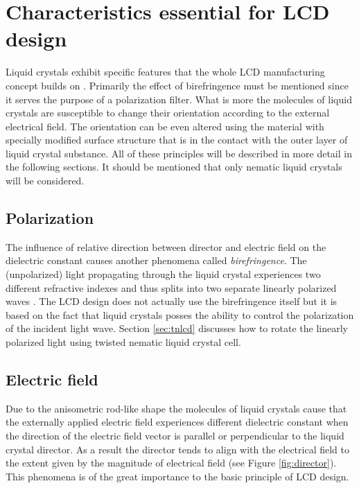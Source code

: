 \section{Characteristics essential for LCD design} \label{txt:charsForLCD}
Liquid crystals exhibit specific features that the whole LCD manufacturing concept builds on \cite{CWRU2011PolymersAndLC}. Primarily the effect of birefringence must be mentioned since it serves the purpose of a polarization filter. What is more the molecules of liquid crystals are susceptible to change their orientation according to the external electrical field. The orientation can be even altered using the material with specially modified surface structure that is in the contact with the outer layer of liquid crystal substance. All of these principles will be described in more detail in the following sections. It should be mentioned that only nematic liquid crystals will be considered.

\subsection{Polarization}
The influence of relative direction between director and electric field on the dielectric constant causes another phenomena called \textit{birefringence}. The (unpolarized) light propagating through the liquid crystal experiences two different refractive indexes and thus splits into two separate linearly polarized waves \cite{Gu2011WorldofLCD}. The LCD design does not actually use the birefringence itself but it is based on the fact that liquid crystals posses the ability to control the polarization of the incident light wave. Section \ref{sec:tnlcd} discusses how to rotate the linearly polarized light using twisted nematic liquid crystal cell.

\subsection{Electric field}
Due to the anisometric rod-like shape the molecules of liquid crystals cause that the externally applied electric field experiences different dielectric constant when the direction of the electric field vector is parallel or perpendicular to the liquid crystal director. As a result the director tends to align with the electrical field to the extent given by the magnitude of electrical field \cite{Desimpel2006LCD} (see Figure \ref{fig:director}). This phenomena is of the great importance to the basic principle of LCD design.

